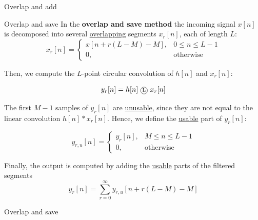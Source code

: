 \documentclass[10pt]{beamer}
\begin{document}
%
\begin{frame}{Overlap and add}
\begin{center}
	\resizebox{0.85\textwidth}{!}{}
\end{center}	
\end{frame}

%
\begin{frame}{Overlap and save}
In the \textbf{overlap and save method} the incoming signal $x[n]$ is decomposed into several \underline{overlapping} segments $x_r[n]$, each of length $L$:
\begin{equation*}
x_r[n] = \begin{cases}
x[n + r(L-M) - M], & 0 \leq n \leq L-1\\
0, & \text{otherwise}
\end{cases}
\end{equation*}

Then, we compute the $L$-point circular convolution of $h[n]$ and $x_r[n]$:

\begin{equation*}
y_r[n] = h[n]~\encircle{L}~x_r[n]
\end{equation*}

The first $M-1$ samples of $y_r[n]$ are \underline{unusable}, since they are not equal to the linear convolution  $h[n]\ast x_r[n]$. Hence, we define the \underline{usable} part of $y_r[n]$:

\begin{equation*}
y_{r,u}[n] = \begin{cases}
y_r[n], & M \leq n \leq L-1 \\
0, &\text{otherwise}
\end{cases}
\end{equation*}

Finally, the output is computed by adding the \underline{usable} parts of the filtered segments
\begin{equation*}
y_r[n] = \sum_{r = 0}^{\infty} y_{r, u}[n + r(L-M) - M]
\end{equation*}
\end{frame}

%
\begin{frame}{Overlap and save}
\begin{center}
	\resizebox{0.85\textwidth}{!}{}
\end{center}	
\end{frame}
\end{document}
